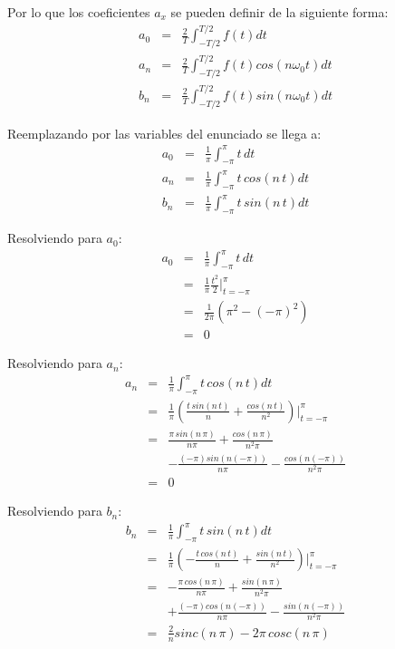 \documentclass[twocolumn]{article}
\begin{document}
Por lo que los coeficientes $a_x$ se pueden definir de la siguiente forma:
\begin{eqnarray*}
a_0 &=& \frac{2}{T}\int_{-T/2}^{T/2}f(t)dt\\
a_n &=& \frac{2}{T}\int_{-T/2}^{T/2}f(t)cos(n\omega_0t)dt\\
b_n &=& \frac{2}{T}\int_{-T/2}^{T/2}f(t)sin(n\omega_0t)dt
\end{eqnarray*}

Reemplazando por las variables del enunciado se llega a:
\begin{eqnarray*}
a_0 &=& \frac{1}{\pi}\int_{-\pi}^{\pi}t\,dt\\
a_n &=& \frac{1}{\pi}\int_{-\pi}^{\pi}t\,cos(n\,t)dt\\
b_n &=& \frac{1}{\pi}\int_{-\pi}^{\pi}t\,sin(n\,t)dt
\end{eqnarray*}

Resolviendo para $a_0$:
\begin{eqnarray*}
a_0 &=& \frac{1}{\pi}\int_{-\pi}^{\pi}t\,dt\\
&=& \frac{1}{\pi} \frac{t^2}{2}\bigg|_{t=-\pi}^{\pi}\\
&=& \frac{1}{2\pi} (\pi^2 - (-\pi)^2)\\
&=& 0
\end{eqnarray*}

Resolviendo para $a_n$:
\begin{eqnarray*}
a_n &=& \frac{1}{\pi}\int_{-\pi}^{\pi}t\,cos(n\,t)dt\\
&=& \frac{1}{\pi} \left(\frac{t\,sin(n\,t)}{n} + \frac{cos(n\,t)}{n^2}\right)\bigg|_{t=-\pi}^{\pi}\\
&=& \frac{\pi\,sin(n\,\pi)}{n\pi} + \frac{cos(n\,\pi)}{n^2\pi}\\
& &- \frac{(-\pi)sin(n(-\pi))}{n\pi} - \frac{cos(n(-\pi))}{n^2\pi}\\
&=& 0
\end{eqnarray*}

Resolviendo para $b_n$:
\begin{eqnarray*}
b_n &=& \frac{1}{\pi}\int_{-\pi}^{\pi}t\,sin(n\,t)dt\\
&=& \frac{1}{\pi} \left(-\frac{t\,cos(n\,t)}{n} + \frac{sin(n\,t)}{n^2}\right)\bigg|_{t=-\pi}^{\pi}\\
&=& -\frac{\pi\,cos(n\,\pi)}{n\pi} + \frac{sin(n\,\pi)}{n^2\pi}\\
& & + \frac{(-\pi)cos(n(-\pi))}{n\pi} - \frac{sin(n(-\pi))}{n^2\pi}\\
&=& \frac{2}{n}sinc(n\,\pi) -2\pi\,cosc(n\,\pi)
\end{eqnarray*}
\end{document}
